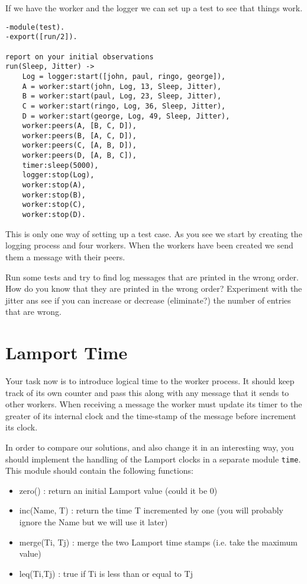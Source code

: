 \documentclass[a4paper, 11pt]{article}
\begin{document}
If we have the worker and the logger we can set up a test to see that
things work.

\begin{verbatim}
-module(test).
-export([run/2]).

report on your initial observations
run(Sleep, Jitter) ->
    Log = logger:start([john, paul, ringo, george]),
    A = worker:start(john, Log, 13, Sleep, Jitter),
    B = worker:start(paul, Log, 23, Sleep, Jitter), 
    C = worker:start(ringo, Log, 36, Sleep, Jitter),
    D = worker:start(george, Log, 49, Sleep, Jitter),
    worker:peers(A, [B, C, D]),
    worker:peers(B, [A, C, D]),
    worker:peers(C, [A, B, D]),
    worker:peers(D, [A, B, C]),
    timer:sleep(5000),
    logger:stop(Log),
    worker:stop(A),
    worker:stop(B),
    worker:stop(C),
    worker:stop(D).
\end{verbatim}

This is only one way of setting up a test case. As you see we start by
creating the logging process and four workers. When the workers have
been created we send them a message with their peers. 

Run some tests and try to find log messages that are printed in the
wrong order. How do you know that they are printed in the wrong
order? Experiment with the jitter ans see if you can increase or
decrease (eliminate?) the number of entries that are wrong.

\section{Lamport Time}

Your task now is to introduce logical time to the worker
process. It should keep track of its own counter and pass this along
with any message that it sends to other workers. When receiving a
message the worker must update its timer to the greater of its
internal clock and the time-stamp of the message before increment
its clock.

In order to compare our solutions, and also change it in an interesting
way, you should implement the handling of the Lamport clocks in a
separate module {\tt time}. This module should contain the following
functions:

\begin{itemize}
\item zero() : return an initial Lamport value (could it be 0)
\item inc(Name, T) : return the time T incremented by one (you will probably ignore the Name but we will use it later)
\item merge(Ti, Tj) : merge the two Lamport time stamps (i.e. take the maximum value)
\item leq(Ti,Tj) : true if Ti is less than or equal to Tj
\end{itemize}
\end{document}

